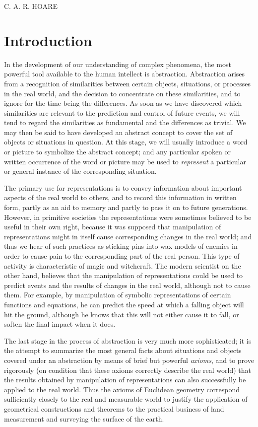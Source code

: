 \documentclass[twoside,11pt]{book}
\begin{document}
{
	\noindent
	\scshape\hfill\scriptsize C. A. R. HOARE\hfill
}
\renewcommand{\leftmark}{\normalfont\scriptsize\hfill C. A. R. HOARE\hfill}
\medskip

\section{Introduction}

In the development of our understanding of complex phenomena, the most powerful tool available to the human intellect is abstraction. Abstraction arises from a recognition of similarities between certain objects, situations, or processes in the real world, and the decision to concentrate on these similarities, and to ignore for the time being the differences. As soon as we have discovered which similarities are relevant to the prediction and control of future events, we will tend to regard the similarities as fundamental and the differences as trivial. We may then be said to have developed an abstract concept to cover the set of objects or situations in question. At this stage, we will usually introduce a word or picture to symbolize the abstract concept; and any particular spoken or written occurrence of the word or picture may be used to \textit{represent} a particular or general instance of the corresponding situation.

The primary use for representations is to convey information about important aspects of the real world to others, and to record this information in written form, partly as an aid to memory and partly to pass it on to future generations. However, in primitive societies the representations were sometimes believed to be useful in their own right, because it was supposed that manipulation of representations might in itself cause corresponding changes in the real world; and thus we hear of such practices as sticking pins into wax models of enemies in order to cause pain to the corresponding part of the real person. This type of activity is characteristic of magic and witchcraft. The modern scientist on the other hand, believes that the manipulation of representations could be used to predict events and the results of changes in the real world, although not to cause them. For example, by manipulation of symbolic representations of certain functions and equations, he can predict the speed at which a falling object will hit the ground, although he knows that this will not either cause it to fall, or soften the final impact when it does.

The last stage in the process of abstraction is very much more sophisticated; it is the attempt to summarize the most general facts about situations and objects covered under an abstraction by means of brief but powerful \textit{axioms}, and to prove rigorously (on condition that these axioms correctly describe the real world) that the results obtained by manipulation of representations can also successfully be applied to the real world. Thus the axioms of Euclidean geometry correspond sufficiently closely to the real and measurable world to justify the application of geometrical constructions and theorems to the practical business of land measurement and surveying the surface of the earth.
\end{document}
